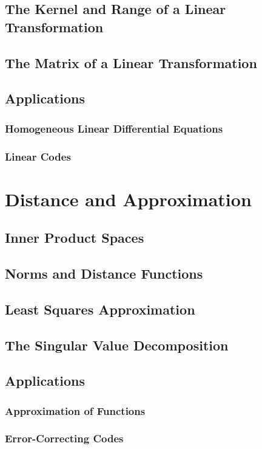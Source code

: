 \documentclass{article}
\begin{document}
	\subsection{The Kernel and Range of a Linear Transformation}
	
	\subsection{The Matrix of a Linear Transformation}
	
	\subsection{Applications}
	
		\subsubsection{Homogeneous Linear Differential Equations}
		\subsubsection{Linear Codes}
	
\clearpage	
\section{Distance and Approximation} %

	\subsection{Inner Product Spaces}
	
	\subsection{Norms and Distance Functions}
	
	\subsection{Least Squares Approximation}
	
	\subsection{The Singular Value Decomposition}
	
	\subsection{Applications}
	
		\subsubsection{Approximation of Functions}
		\subsubsection{Error-Correcting Codes}
\end{document}
